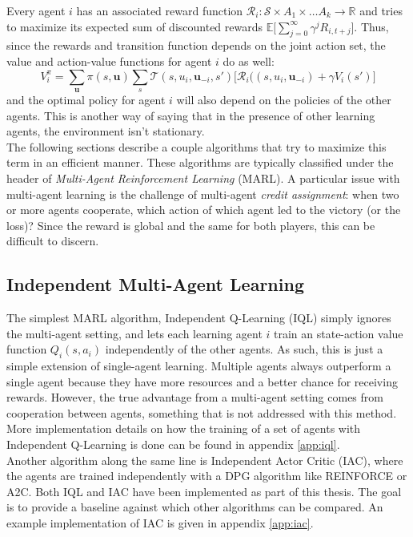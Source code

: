 Every agent $i$ has an associated reward function $\mathcal{R}_i: \mathcal{S} \times A_1 \times \ldots A_k \rightarrow \mathbb{R}$ and tries to maximize its expected sum of discounted rewards $\mathbb{E}\Big [ \sum_{j=0}^{\infty} \gamma^j R_{i, t+j} \Big ]$. Thus, since the rewards and transition function depends on the joint action set, the value and action-value functions for agent $i$ do as well:
\begin{equation}
    V_i^{\pi} = \sum_{\bm{u}}\pi(s, \bm{u}) \sum_{s} \mathcal{T}(s, u_i, \bm{u}_{-i}, s') \big [\mathcal{R}_i((s, u_i, \bm{u}_{-i}) + \gamma V_i(s')]
\end{equation}
and the optimal policy for agent $i$ will also depend on the policies of the other agents. This is another way of saying that in the presence of other learning agents, the environment isn't stationary.\\
The following sections describe a couple algorithms that try to maximize this term in an efficient manner. These algorithms are typically classified under the header of \emph{Multi-Agent Reinforcement Learning} (MARL).
A particular issue with multi-agent learning is the challenge of multi-agent \emph{credit assignment}: when two or more agents cooperate, which action of which agent led to the victory (or the loss)? Since the reward is global and the same for both players, this can be difficult to discern.
\subsection{Independent Multi-Agent Learning}
\label{sec:intro_deep_indep_rl}
The simplest MARL algorithm, Independent Q-Learning (IQL) \cite{tan1993multi} simply ignores the multi-agent setting, and lets each learning agent $i$ train an state-action value function $Q_i(s, a_i)$ independently of the other agents. As such, this is just a simple extension of single-agent learning. Multiple agents always outperform a single agent because they have more resources and a better chance for receiving rewards. However, the true advantage from a multi-agent setting comes from cooperation between agents, something that is not addressed with this method. More implementation details on how the training of a set of agents with Independent Q-Learning is done can be found in appendix \ref{app:iql}.\\
Another algorithm along the same line is Independent Actor Critic (IAC), where the agents are trained independently with a DPG algorithm like REINFORCE or A2C. Both IQL and IAC have been implemented as part of this thesis. The goal is to provide a baseline against which other algorithms can be compared. An example implementation of IAC is given in appendix \ref{app:iac}.

